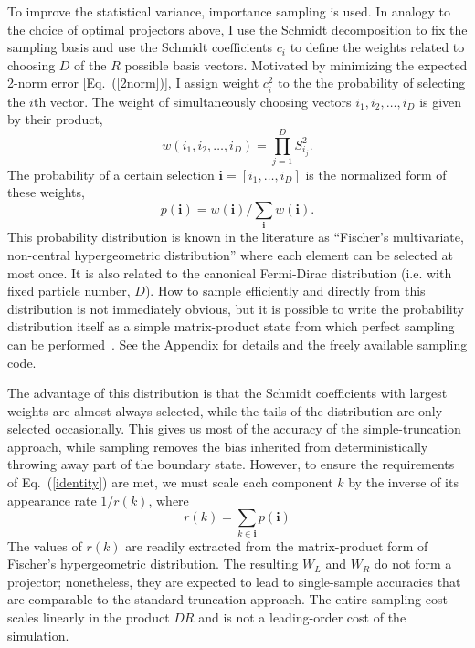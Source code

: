\documentclass[aps,prl,nopacs,twocolumn]{revtex4}
\newcommand {\Eqn}[1] {Eq.~(\ref{#1})}
\begin{document}
To improve the statistical variance, importance sampling is used. In analogy to the choice of optimal projectors above, I use the Schmidt decomposition to fix the sampling basis and use the Schmidt coefficients $c_i$ to define the weights related to choosing $D$ of the $R$ possible basis vectors. Motivated by minimizing the expected 2-norm error [\Eqn{2norm}], I assign weight $c_i^2$ to the the probability of selecting the $i$th vector. The weight of simultaneously choosing vectors $i_1, i_2, \dots, i_D$ is given by their product,
\begin{equation}
    w(i_1,i_2,\dots,i_D) = \prod_{j=1}^D S_{i_j}^2. \label{weight}
\end{equation}
The probability of a certain selection $\mathbf{i} = [i_1,\dots, i_D]$ is the normalized form of these weights,
\begin{equation}
    p(\mathbf{i}) = w(\mathbf{i}) / \sum_{\mathbf{i}} w(\mathbf{i}). \label{probability}
\end{equation}
This probability distribution is known in the literature as ``Fischer's multivariate, non-central hypergeometric distribution'' where each element can be selected at most once. It is also related to the canonical Fermi-Dirac distribution (i.e. with fixed particle number, $D$). How to sample efficiently and directly from this distribution is not immediately obvious, but it is possible to write the probability distribution itself as a simple matrix-product state from which perfect sampling can be performed~\cite{Ferris2012,Stoudenmire2010}. See the Appendix for details and the freely available sampling code. 

The advantage of this distribution is that the Schmidt coefficients with largest weights are almost-always selected, while the tails of the distribution are only selected occasionally. This gives us most of the accuracy of the simple-truncation approach, while sampling removes the bias inherited from deterministically throwing away part of the boundary state. However, to ensure the requirements of \Eqn{identity} are met, we must scale each component $k$ by the inverse of its appearance rate $1/r(k)$, where
\begin{equation}
    r(k) = \sum_{k\in\mathbf{i}} p(\mathbf{i}) \label{rate}
\end{equation}
The values of $r(k)$ are readily extracted from the matrix-product form of Fischer's hypergeometric distribution. The resulting $W_L$ and $W_R$ do not form a projector; nonetheless, they are expected to lead to single-sample accuracies that are comparable to the standard truncation approach. The entire sampling cost scales linearly in the product $DR$ and is not a leading-order cost of the simulation.
\end{document}

